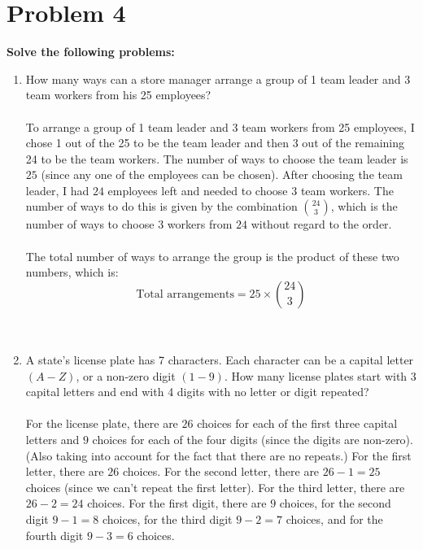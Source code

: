 \documentclass{amsart}
\theoremstyle{definition}
\theoremstyle{Exercise}
\theoremstyle{remark}
\theoremstyle{rule}
\numberwithin{equation}{section}
\begin{document}
  \section*{Problem 4}
  {\bf Solve the following problems:}
  \begin{enumerate}[label=(\alph*)]
    \item How many ways can a store manager arrange a group of 1 team leader and 3 team workers from his 25 employees?
\\\\
To arrange a group of 1 team leader and 3 team workers from 25 employees, I chose 1 out of the 25 to be the team leader and then 3 out of the remaining 24 to be the team workers. The number of ways to choose the team leader is \(25\) (since any one of the employees can be chosen). After choosing the team leader, I had \(24\) employees left and needed to choose \(3\) team workers. The number of ways to do this is given by the combination \(24 \choose 3\), which is the number of ways to choose \(3\) workers from \(24\) without regard to the order.
\\\\
The total number of ways to arrange the group is the product of these two numbers, which is:
\[
\text{Total arrangements} = 25 \times \binom{24}{3}
\]
\\\\
    \item A state’s license plate has 7 characters. Each character can be a capital letter $(A-Z)$, or a non-zero digit $(1-9)$. How many license plates start with 3 capital letters and end with 4 digits with no letter or digit repeated?
\\\\
For the license plate, there are \(26\) choices for each of the first three capital letters and \(9\) choices for each of the four digits (since the digits are non-zero). (Also taking into account for the fact that there are no repeats.) For the first letter, there are \(26\) choices. For the second letter, there are \(26 - 1 = 25\) choices (since we can't repeat the first letter). For the third letter, there are \(26 - 2 = 24\) choices. For the first digit, there are \(9\) choices, for the second digit \(9 - 1 = 8\) choices, for the third digit \(9 - 2 = 7\) choices, and for the fourth digit \(9 - 3 = 6\) choices.

\end{enumerate}
\end{document}
